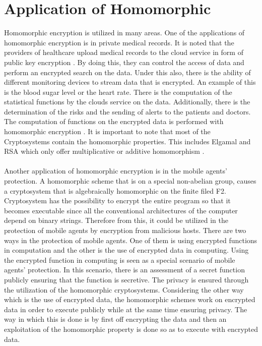 \section{Application of Homomorphic}
Homomorphic encryption is utilized in many areas. One of the applications of homomorphic encryption is in private medical records. It is noted that the providers of healthcare upload medical records to the cloud service in form of public key encryption \cite{naehrig2011can}. By doing this, they can control the access of data and perform an encrypted search on the data. Under this also, there is the ability of different monitoring devices to stream data that is encrypted. An example of this is the blood sugar level or the heart rate. There is the computation of the statistical functions by the clouds service on the data. Additionally, there is the determination of the risks and the sending of alerts to the patients and doctors. The computation of functions on the encrypted data is performed with homomorphic encryption \cite{naehrig2011can}. It is important to note that most of the Cryptosystems contain the homomorphic properties. This includes Elgamal and RSA which only offer multiplicative or additive homomorphism \cite{naehrig2011can}.\\\\
Another application of homomorphic encryption is in the mobile agents’ protection. A homomorphic scheme that is on a special non-abelian group, causes a cryptosystem that is algebraically homomorphic on the finite filed F2\cite{sen2013homomorphic}. Cryptosystem has the possibility to encrypt the entire program so that it becomes executable since all the conventional architectures of the computer depend on binary strings\cite{sen2013homomorphic}. Therefore from this, it could be utilized in the protection of mobile agents by encryption from malicious hosts. There are two ways in the protection of mobile agents. One of them is using encrypted functions in computation and the other is the use of encrypted data in computing. Using the encrypted function in computing is seen as a special scenario of mobile agents’ protection. In this scenario, there is an assessment of a secret function publicly ensuring that the function is secretive. The privacy is ensured through the utilization of the homomorphic cryptosystems. Considering the other way which is the use of encrypted data, the homomorphic schemes work on encrypted data in order to execute publicly while at the same time ensuring privacy. The way in which this is done is by first off encrypting the data and then an exploitation of the homomorphic property is done so as to execute with encrypted data.\\\\

